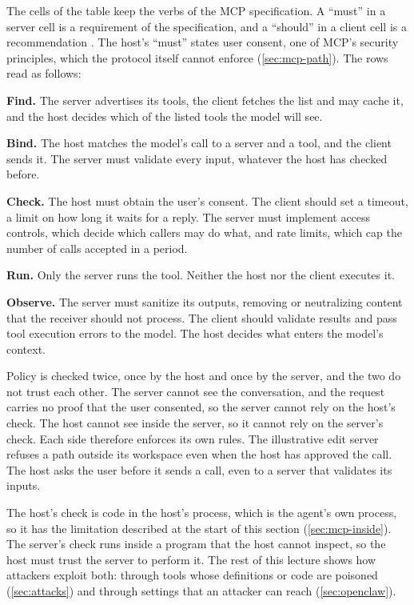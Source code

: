 The cells of the table keep the verbs of the MCP specification. A ``must'' in a server cell is a
requirement of the specification, and a ``should'' in a client cell is a recommendation
\citep{mcp-spec-2026}. The host's ``must'' states user consent, one of MCP's security principles,
which the protocol itself cannot enforce (\cref{sec:mcp-path}). The rows read as follows:
\bi
\item \textbf{Find.} The server advertises its tools, the client fetches the list and may cache it,
and the host decides which of the listed tools the model will see.
\item \textbf{Bind.} The host matches the model's call to a server and a tool, and the client sends
it. The server must validate every input, whatever the host has checked before.
\item \textbf{Check.} The host must obtain the user's consent. The client should set a timeout, a
limit on how long it waits for a reply. The server must implement access controls, which decide
which callers may do what, and rate limits, which cap the number of calls accepted in a period.
\item \textbf{Run.} Only the server runs the tool. Neither the host nor the client executes it.
\item \textbf{Observe.} The server must sanitize its outputs, removing or neutralizing content that
the receiver should not process. The client should validate results and pass tool execution errors
to the model. The host decides what enters the model's context.
\ei

Policy is checked twice, once by the host and once by the server, and the two do not trust each
other. The server cannot see the conversation, and the request carries no proof that the user
consented, so the server cannot rely on the host's check. The host cannot see inside the server, so
it cannot rely on the server's check. Each side therefore enforces its own rules. The illustrative
edit server refuses a path outside its workspace even when the host has approved the call. The host
asks the user before it sends a call, even to a server that validates its inputs.

The host's check is code in the host's process, which is the agent's own process, so it has the
limitation described at the start of this section (\cref{sec:mcp-inside}). The server's check runs inside a program that the host cannot
inspect, so the host must trust the server to perform it. The rest of this lecture shows how
attackers exploit both: through tools whose definitions or code are poisoned (\cref{sec:attacks})
and through settings that an attacker can reach (\cref{sec:openclaw}).


